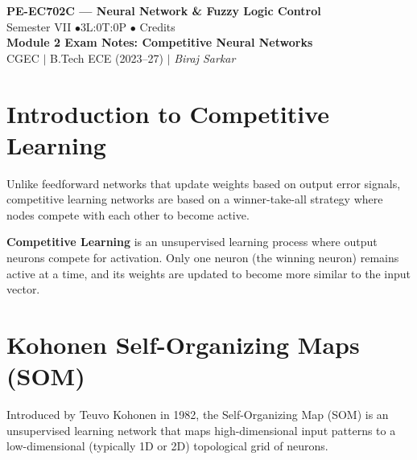 \documentclass[12pt,a4paper]{article}
\begin{document}

\begin{center}
  {\LARGE\bfseries\color{myred} PE-EC702C --- Neural Network \& Fuzzy Logic Control}\\[5pt]
  {\normalsize\color{mydark} Semester VII \quad$\bullet$\quad 3L:0T:0P \quad$\bullet$ Credits}\\[3pt]
  {\normalsize\color{myteal}\textbf{Module 2 Exam Notes: Competitive Neural Networks}}\\[3pt]
  {\small\color{mydark} CGEC \;$|$\; B.Tech ECE (2023--27) \;$|$\; \textit{Biraj Sarkar}}
\end{center}
\vspace{2pt}
\noindent{\color{myred}\rule{\linewidth}{1.5pt}}
\vspace{2pt}

\hypersetup{linkcolor=mydark}
\tableofcontents
\hypersetup{linkcolor=myteal}
\newpage

\section{Introduction to Competitive Learning}

Unlike feedforward networks that update weights based on output error signals, competitive learning networks are based on a winner-take-all strategy where nodes compete with each other to become active.

\begin{tcolorbox}[defbox, title={Competitive Learning}]
\textbf{Competitive Learning} is an unsupervised learning process where output neurons compete for activation. Only one neuron (the winning neuron) remains active at a time, and its weights are updated to become more similar to the input vector.
\end{tcolorbox}

\section{Kohonen Self-Organizing Maps (SOM)}

Introduced by Teuvo Kohonen in 1982, the Self-Organizing Map (SOM) is an unsupervised learning network that maps high-dimensional input patterns to a low-dimensional (typically 1D or 2D) topological grid of neurons.
\end{document}
